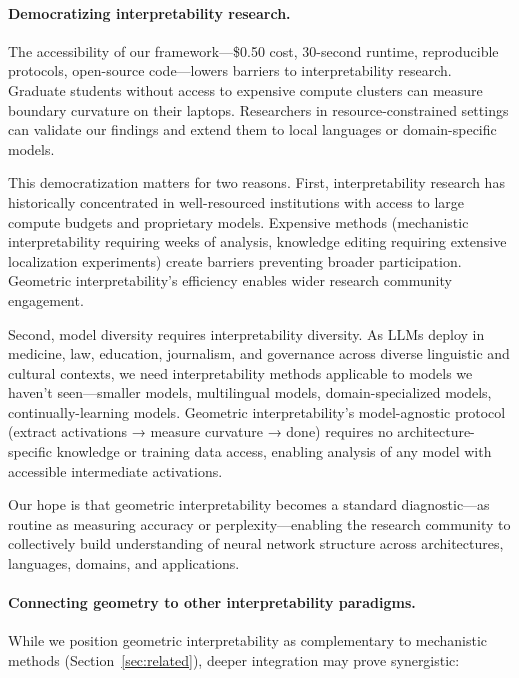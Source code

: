 \documentclass[11pt]{article}
\begin{document}
\paragraph{Democratizing interpretability research.}
The accessibility of our framework—\$0.50 cost, 30-second runtime, reproducible protocols, open-source code—lowers barriers to interpretability research. Graduate students without access to expensive compute clusters can measure boundary curvature on their laptops. Researchers in resource-constrained settings can validate our findings and extend them to local languages or domain-specific models.

This democratization matters for two reasons. First, interpretability research has historically concentrated in well-resourced institutions with access to large compute budgets and proprietary models. Expensive methods (mechanistic interpretability requiring weeks of analysis, knowledge editing requiring extensive localization experiments) create barriers preventing broader participation. Geometric interpretability's efficiency enables wider research community engagement.

Second, model diversity requires interpretability diversity. As LLMs deploy in medicine, law, education, journalism, and governance across diverse linguistic and cultural contexts, we need interpretability methods applicable to models we haven't seen—smaller models, multilingual models, domain-specialized models, continually-learning models. Geometric interpretability's model-agnostic protocol (extract activations → measure curvature → done) requires no architecture-specific knowledge or training data access, enabling analysis of any model with accessible intermediate activations.

Our hope is that geometric interpretability becomes a standard diagnostic—as routine as measuring accuracy or perplexity—enabling the research community to collectively build understanding of neural network structure across architectures, languages, domains, and applications.

\paragraph{Connecting geometry to other interpretability paradigms.}
While we position geometric interpretability as complementary to mechanistic methods (Section~\ref{sec:related}), deeper integration may prove synergistic:
\end{document}
